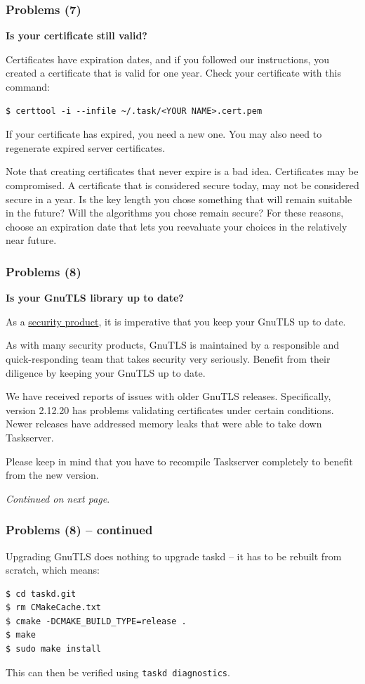 \documentclass[t,handout]{beamer}
\begin{document}
\begin{frame}[fragile]\frametitle{Problems (7)}
    \textbf{Is your certificate still valid?}

    Certificates have expiration dates, and if you followed our instructions, you created a certificate that is valid for one year.  Check your certificate with this command:

    \begin{lstlisting}
$ certtool -i --infile ~/.task/<YOUR NAME>.cert.pem\end{lstlisting}

    If your certificate has expired, you need a new one.  You may also need to regenerate expired server certificates.

    Note that creating certificates that never expire is a bad idea. Certificates may be compromised. A certificate that is considered secure today, may not be considered secure in a year. Is the key length you chose something that will remain suitable in the future? Will the algorithms you          chose remain secure? For these reasons, choose an expiration date that lets you reevaluate your choices in the relatively near future.
\end{frame}

\begin{frame}[fragile]\frametitle{Problems (8)}
    \textbf{Is your GnuTLS library up to date?}

    As a \href{http://gnutls.org/security.html}{security product}, it is imperative that you keep your GnuTLS up to date.

    As with many security products, GnuTLS is maintained by a responsible and quick-responding team that takes security very seriously.  Benefit from their diligence by keeping your GnuTLS up to date.

    We have received reports of issues with older GnuTLS releases. Specifically, version 2.12.20 has problems validating certificates under certain conditions. Newer releases have addressed memory leaks that were able to take down Taskserver.

    Please keep in mind that you have to recompile Taskserver completely to benefit from the new version.

    \emph{Continued on next page}.
\end{frame}

\begin{frame}[fragile]\frametitle{Problems (8) -- continued}
    Upgrading GnuTLS does nothing to upgrade taskd -- it has to be rebuilt from scratch, which means:

    \begin{lstlisting}
$ cd taskd.git
$ rm CMakeCache.txt
$ cmake -DCMAKE_BUILD_TYPE=release .
$ make
$ sudo make install\end{lstlisting}

    This can then be verified using \verb+taskd diagnostics+.
\end{frame}
\end{document}

